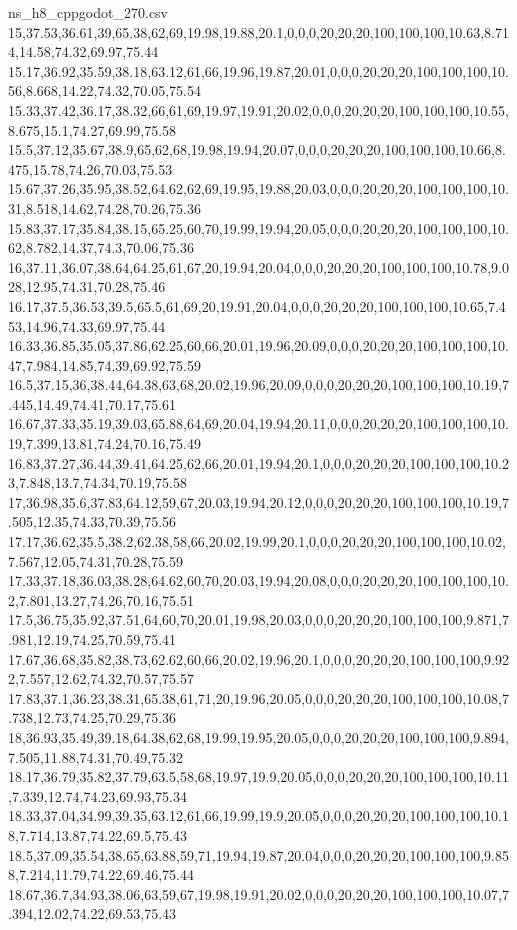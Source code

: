 \begin{filecontents*}[overwrite]{ns_h8_cppgodot_270.csv}
15,37.53,36.61,39,65.38,62,69,19.98,19.88,20.1,0,0,0,20,20,20,100,100,100,10.63,8.714,14.58,74.32,69.97,75.44
15.17,36.92,35.59,38.18,63.12,61,66,19.96,19.87,20.01,0,0,0,20,20,20,100,100,100,10.56,8.668,14.22,74.32,70.05,75.54
15.33,37.42,36.17,38.32,66,61,69,19.97,19.91,20.02,0,0,0,20,20,20,100,100,100,10.55,8.675,15.1,74.27,69.99,75.58
15.5,37.12,35.67,38.9,65,62,68,19.98,19.94,20.07,0,0,0,20,20,20,100,100,100,10.66,8.475,15.78,74.26,70.03,75.53
15.67,37.26,35.95,38.52,64.62,62,69,19.95,19.88,20.03,0,0,0,20,20,20,100,100,100,10.31,8.518,14.62,74.28,70.26,75.36
15.83,37.17,35.84,38.15,65.25,60,70,19.99,19.94,20.05,0,0,0,20,20,20,100,100,100,10.62,8.782,14.37,74.3,70.06,75.36
16,37.11,36.07,38.64,64.25,61,67,20,19.94,20.04,0,0,0,20,20,20,100,100,100,10.78,9.028,12.95,74.31,70.28,75.46
16.17,37.5,36.53,39.5,65.5,61,69,20,19.91,20.04,0,0,0,20,20,20,100,100,100,10.65,7.453,14.96,74.33,69.97,75.44
16.33,36.85,35.05,37.86,62.25,60,66,20.01,19.96,20.09,0,0,0,20,20,20,100,100,100,10.47,7.984,14.85,74.39,69.92,75.59
16.5,37.15,36,38.44,64.38,63,68,20.02,19.96,20.09,0,0,0,20,20,20,100,100,100,10.19,7.445,14.49,74.41,70.17,75.61
16.67,37.33,35.19,39.03,65.88,64,69,20.04,19.94,20.11,0,0,0,20,20,20,100,100,100,10.19,7.399,13.81,74.24,70.16,75.49
16.83,37.27,36.44,39.41,64.25,62,66,20.01,19.94,20.1,0,0,0,20,20,20,100,100,100,10.23,7.848,13.7,74.34,70.19,75.58
17,36.98,35.6,37.83,64.12,59,67,20.03,19.94,20.12,0,0,0,20,20,20,100,100,100,10.19,7.505,12.35,74.33,70.39,75.56
17.17,36.62,35.5,38.2,62.38,58,66,20.02,19.99,20.1,0,0,0,20,20,20,100,100,100,10.02,7.567,12.05,74.31,70.28,75.59
17.33,37.18,36.03,38.28,64.62,60,70,20.03,19.94,20.08,0,0,0,20,20,20,100,100,100,10.2,7.801,13.27,74.26,70.16,75.51
17.5,36.75,35.92,37.51,64,60,70,20.01,19.98,20.03,0,0,0,20,20,20,100,100,100,9.871,7.981,12.19,74.25,70.59,75.41
17.67,36.68,35.82,38.73,62.62,60,66,20.02,19.96,20.1,0,0,0,20,20,20,100,100,100,9.922,7.557,12.62,74.32,70.57,75.57
17.83,37.1,36.23,38.31,65.38,61,71,20,19.96,20.05,0,0,0,20,20,20,100,100,100,10.08,7.738,12.73,74.25,70.29,75.36
18,36.93,35.49,39.18,64.38,62,68,19.99,19.95,20.05,0,0,0,20,20,20,100,100,100,9.894,7.505,11.88,74.31,70.49,75.32
18.17,36.79,35.82,37.79,63.5,58,68,19.97,19.9,20.05,0,0,0,20,20,20,100,100,100,10.11,7.339,12.74,74.23,69.93,75.34
18.33,37.04,34.99,39.35,63.12,61,66,19.99,19.9,20.05,0,0,0,20,20,20,100,100,100,10.18,7.714,13.87,74.22,69.5,75.43
18.5,37.09,35.54,38.65,63.88,59,71,19.94,19.87,20.04,0,0,0,20,20,20,100,100,100,9.858,7.214,11.79,74.22,69.46,75.44
18.67,36.7,34.93,38.06,63,59,67,19.98,19.91,20.02,0,0,0,20,20,20,100,100,100,10.07,7.394,12.02,74.22,69.53,75.43

\end{filecontents*}
